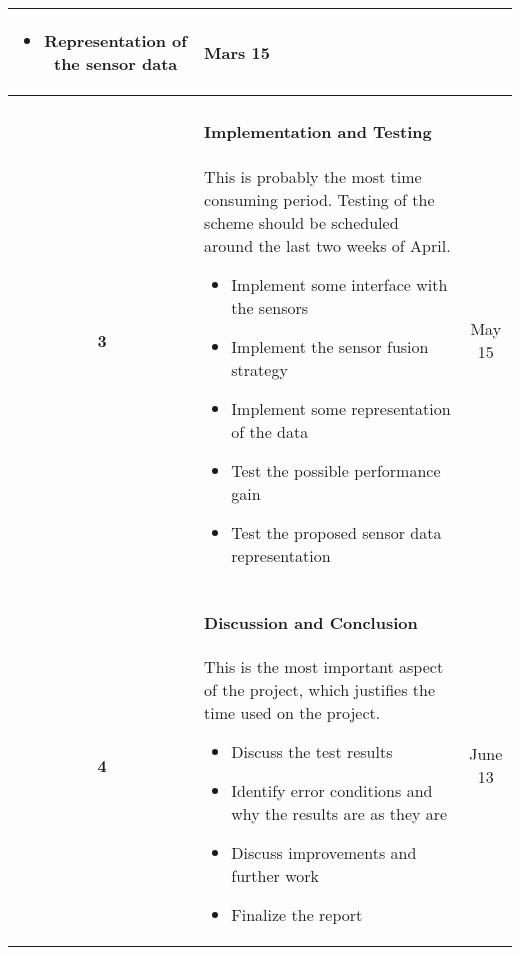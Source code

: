\documentclass[a4paper, 10pt]{article}
\begin{document}
\begin{tabular}{| c | p{11.5cm} || c |}
\begin{itemize}
                            \item Representation of the sensor data
                        \end{itemize}
                                                       & Mars 15 \\
        \hline
        \textbf{3}  &   \paragraph{Implementation and Testing} This is probably the most
                        time consuming period. Testing of the scheme should be scheduled
                        around the last two weeks of April.
                        \begin{itemize}
                            \item Implement some interface with the sensors
                            \item Implement the sensor fusion strategy
                            \item Implement some representation of the data
                            \item Test the possible performance gain
                            \item Test the proposed sensor data representation
                        \end{itemize}
                                                       & May 15 \\
        \hline
        \textbf{4}  &   \paragraph{Discussion and Conclusion} This is the most important
                        aspect of the project, which justifies the time used on the
                        project.
                        \begin{itemize}
                            \item Discuss the test results
                            \item Identify error conditions and why the results are as
                                they are
                            \item Discuss improvements and further work
                            \item Finalize the report
                        \end{itemize}
                                                       & June 13 \\
    \hline
\end{tabular}
\end{document}
